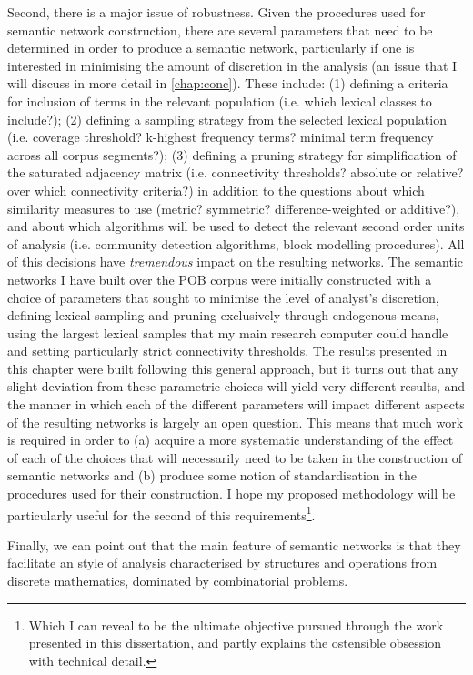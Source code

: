 Second, there is a major issue of robustness.
Given the procedures used for semantic network construction, there are several parameters that need to be determined in order to produce a semantic network, particularly if one is interested in minimising the amount of discretion in the analysis (an issue that I will discuss in more detail in \autoref{chap:conc}).
These include: (1) defining a criteria for inclusion of terms in the relevant population (i.e. which lexical classes to include?); (2) defining a sampling strategy from the selected lexical population (i.e. coverage threshold? k-highest frequency terms? minimal term frequency across all corpus segments?); (3) defining a pruning strategy for simplification of the saturated adjacency matrix (i.e. connectivity thresholds? absolute or relative? over which connectivity criteria?) in addition to the questions about which similarity measures to use (metric? symmetric? difference-weighted or additive?), and about which algorithms will be used to detect the relevant second order units of analysis (i.e. community detection algorithms, block modelling procedures).
All of this decisions have \emph{tremendous} impact on the resulting networks.
The semantic networks I have built over the POB corpus were initially constructed with a choice of parameters that sought to minimise the level of analyst's discretion, defining lexical sampling and pruning exclusively through endogenous means, using the largest lexical samples that my main research computer could handle and setting particularly strict connectivity thresholds.
The results presented in this chapter were built following this general approach, but it turns out that any slight deviation from these parametric choices will yield very different results, and the manner in which each of the different parameters will impact different aspects of the resulting networks is largely an open question.
This means that much work is required in order to (a) acquire a more systematic understanding of the effect of each of the choices that will necessarily need to be taken in the construction of semantic networks and (b) produce some notion of standardisation in the procedures used for their construction.
I hope my proposed methodology will be particularly useful for the second of this requirements\footnote{
    Which I can reveal to be the ultimate objective pursued through the work presented in this dissertation, and partly explains the ostensible obsession with technical detail.
}.

Finally, we can point out that the main feature of semantic networks is that they facilitate an style of analysis characterised by structures and operations from discrete mathematics, dominated by combinatorial problems.

